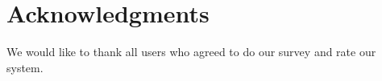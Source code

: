 \section{Acknowledgments}
We would like to thank all users who agreed to do our survey and rate our system. 

